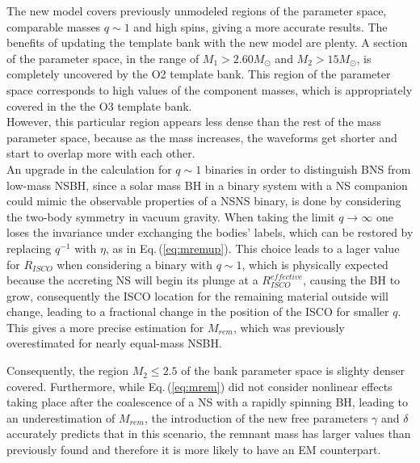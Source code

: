\documentclass[binding=0.6cm, LaM]{sapthesis}
\begin{document}
        The new model covers previously unmodeled regions of the parameter space, comparable masses $q \sim 1$ and high spins,
        giving a more accurate  results.
	The benefits of updating the template bank with the new model are plenty.
	A section of the parameter space, in the range  of $M_1 >  2.60 M_\odot$  and $M_2 > 15 M_\odot $,
	is completely uncovered by the O2 template bank.
	This region of the parameter space corresponds to high values of the component masses,
	which is appropriately covered in the the O3 template bank. \\
	However, this particular region appears less dense than the rest of the mass parameter space, 
	because as the mass increases, the waveforms get shorter and start to overlap more with each other. \\
        An upgrade in the calculation for $q \sim 1$ binaries in order to distinguish BNS from low-mass NSBH,
        since a solar mass BH in a binary system with a NS companion could mimic the observable properties of a NSNS binary,
        is done by considering the two-body symmetry in vacuum gravity.
        When taking the limit $q \rightarrow \infty$ one loses the invariance under exchanging the bodies' labels,
        which can be restored by replacing $q^{-1}$ with $\eta$, as in Eq.\,(\ref{eq:mremup}).
        This choice leads to a lager value for $R_{ISCO}$ when considering a binary with $q \sim 1$,
        which is physically expected because the accreting NS will begin its plunge at a $R_{ISCO}^{effective}$,
        causing the BH to grow, consequently the ISCO location for the remaining material outside will change,
        leading to a fractional change in the position of the ISCO for smaller $q$.
        This gives a more precise estimation for $M_{rem}$, which was previously overestimated for nearly equal-mass NSBH.

        Consequently, the region $M_2 \leq 2.5$ of the bank parameter space is slighty denser covered.
        Furthermore, while Eq.\,(\ref{eq:mrem}) did not consider nonlinear effects taking place after the coalescence of a NS
        with a rapidly spinning BH, leading to an underestimation of $M_{rem}$,
        the introduction of the new free parameters $\gamma$ and $\delta$ accurately predicts that in this scenario,
        the remnant mass has larger values than previously found and therefore it is more likely to have an EM counterpart.
\end{document}
